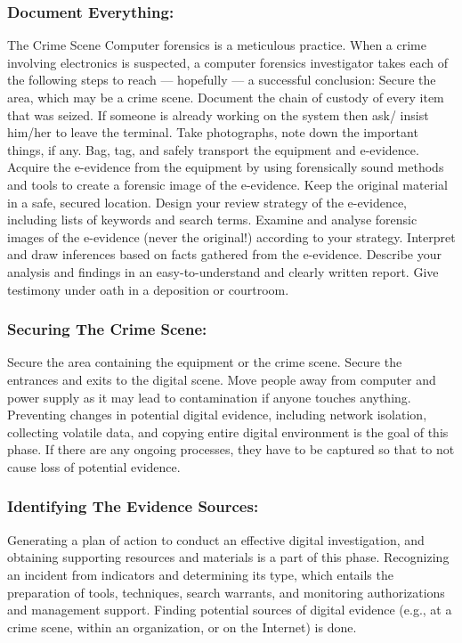 \documentclass[british]{article}
\begin{document}
\subsubsection{Document Everything:}

The Crime Scene Computer forensics is a meticulous practice. When
a crime involving electronics is suspected, a computer forensics investigator
takes each of the following steps to reach --- hopefully --- a successful
conclusion: Secure the area, which may be a crime scene. Document
the chain of custody of every item that was seized. If someone is
already working on the system then ask/ insist him/her to leave the
terminal. Take photographs, note down the important things, if any.
Bag, tag, and safely transport the equipment and e-evidence. Acquire
the e-evidence from the equipment by using forensically sound methods
and tools to create a forensic image of the e-evidence. Keep the original
material in a safe, secured location. Design your review strategy
of the e-evidence, including lists of keywords and search terms. Examine
and analyse forensic images of the e-evidence (never the original!)
according to your strategy. Interpret and draw inferences based on
facts gathered from the e-evidence. Describe your analysis and findings
in an easy-to-understand and clearly written report. Give testimony
under oath in a deposition or courtroom.

\subsubsection{Securing The Crime Scene:}

Secure the area containing the equipment or the crime scene. Secure
the entrances and exits to the digital scene. Move people away from
computer and power supply as it may lead to contamination if anyone
touches anything. Preventing changes in potential digital evidence,
including network isolation, collecting volatile data, and copying
entire digital environment is the goal of this phase. If there are
any ongoing processes, they have to be captured so that to not cause
loss of potential evidence.

\subsubsection{Identifying The Evidence Sources:}

Generating a plan of action to conduct an effective digital investigation,
and obtaining supporting resources and materials is a part of this
phase. Recognizing an incident from indicators and determining its
type, which entails the preparation of tools, techniques, search warrants,
and monitoring authorizations and management support. Finding potential
sources of digital evidence (e.g., at a crime scene, within an organization,
or on the Internet) is done.
\end{document}
